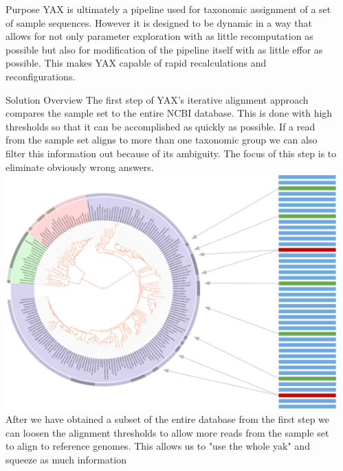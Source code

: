 \documentclass[final,t]{beamer}
\begin{document}
\begin{frame}{}
\begin{columns}[t]
\begin{column}{.3\linewidth}
    \end{column}
    \begin{column}{.3\linewidth}
        \begin{block}{Purpose}
            YAX is ultimately a pipeline used for taxonomic assignment of a set of sample sequences. However it is designed to
            be dynamic in a way that allows for not only parameter exploration with as little recomputation as possible but also
            for modification of the pipeline itself with as little effor as possible. This makes YAX capable of rapid recalculations
            and reconfigurations.
        \end{block}

        \begin{block}{Solution Overview}
            The first step of YAX's iterative alignment approach compares the sample set to the entire NCBI database. This is done
            with high thresholds so that it can be accomplished as quickly as possible. If a read from the sample set aligns to more than
            one taxonomic group we can also filter this information out because of its ambiguity. The focus of this step is to eliminate
            obviously wrong answers.
            \includegraphics[width=1\linewidth]{assets/Whole} \\
            After we have obtained a subset of the entire database from the first step we can loosen the alignment thresholds to allow more
            reads from the sample set to align to reference genomes. This allows us to "use the whole yak" and squeeze as much information

\end{block}
\end{column}
\end{columns}
\end{frame}
\end{document}
